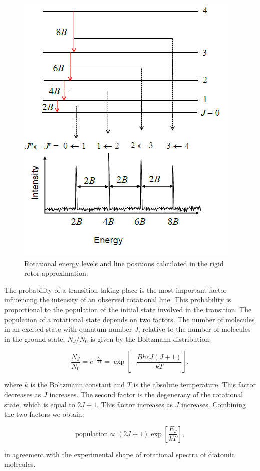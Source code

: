 \documentclass[
  9pt,
]{extbook}
\theoremstyle{definition}
\theoremstyle{definition}
\theoremstyle{definition}
\theoremstyle{remark}
\begin{document}
\begin{figure}

{\centering \includegraphics[width=0.5\linewidth]{./img/OEP_wiki5} 

}

\caption{Rotational energy levels and line positions calculated in the rigid rotor approximation.}\label{fig:Fig1c13}
\end{figure}

The probability of a transition taking place is the most important factor influencing the intensity of an observed rotational line. This probability is proportional to the population of the initial state involved in the transition. The population of a rotational state depends on two factors. The number of molecules in an excited state with quantum number \(J\), relative to the number of molecules in the ground state, \(N_J/N_0\) is given by the Boltzmann distribution:

\begin{equation}
\frac{N_J}{N_0}=e^{-\frac{E_J}{kT}} =\exp\left[-\frac {BhcJ(J+1)}{kT}\right],
\label{eq:rot6}
\end{equation}

where \(k\) is the Boltzmann constant and \(T\) is the absolute temperature. This factor decreases as \(J\) increases. The second factor is the degeneracy of the rotational state, which is equal to \(2J+1\). This factor increases as \(J\) increases. Combining the two factors we obtain:

\begin{equation}
\mathrm{population} \propto (2J+1)\exp\left[\frac{E_J}{kT}\right],
\label{eq:rot7}
\end{equation}

in agreement with the experimental shape of rotational spectra of diatomic molecules.
\end{document}
